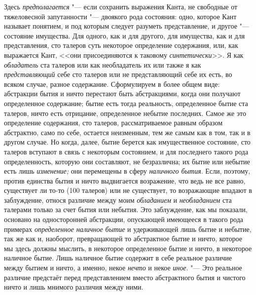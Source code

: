 Здесь {\em предполагается} "--- если сохранить выражения Канта, не свободные от
тяжеловесной запутанности "--- двоякого рода состояния: одно, которое Кант
называет понятием, и под которым следует разуметь представление, и другое "---
состояние имущества. Для одного, как и для другого, для имущества, как и для
представления, сто талеров суть некоторое определение содержания, или, как
выражается Кант, <<они присоединяются к таковому {\em синтетически}>>. Я как
{\em обладатель} ста талеров или как необладатель их или также я как {\em
представляющий} себе сто талеров или не представляющий себе их есть, во всяком
случае, разное содержание. Сформулируем в более общем виде: абстракции бытия и
ничто перестают быть абстракциями, когда они получают определенное содержание;
бытие есть тогда реальность, определенное бытие ста талеров, ничто есть
отрицание, определенное небытие последних. Самое же это определение содержания,
сто талеров, рассматриваемое равным образом абстрактно, само по себе, остается
неизменным, тем же самым как в том, так и в другом случае. Но когда, далее,
бытие берется как имущественное состояние, сто талеров вступают в связь с
некоторым состоянием, и для последнего такого рода определенность, которую они
составляют, не безразлична; их бытие или небытие есть лишь {\em изменение;} они
перемещены в сферу {\em наличного бытия}. Если, поэтому, против единства бытия
и ничто выдвигается возражение, что ведь не все равно, существует ли то-то (100
талеров) или не существует, то возражающие впадают в заблуждение, относя
различие между моим {\em обладанием} и {\em необладанием} ста талерами только
за счет бытия или небытия. Это заблуждение, как мы показали, основано на
односторонней абстракции, опускающей имеющееся в такого рода примерах {\em
определенное наличное бытие} и удерживающей лишь бытие и небытие, так же как и,
наоборот, превращающей то абстрактное бытие и ничто, которое мы здесь должны
мыслить, в некоторое определенное бытие и ничто, в некоторое наличное бытие.
Лишь наличное бытие содержит в себе реальное различие между бытием и ничто, а
именно, некое {\em нечто} и некое {\em иное}. "--- Это реальное различие
предстаёт перед представлением вместо абстрактного бытия и чистого ничто и лишь
мнимого различия между ними.

